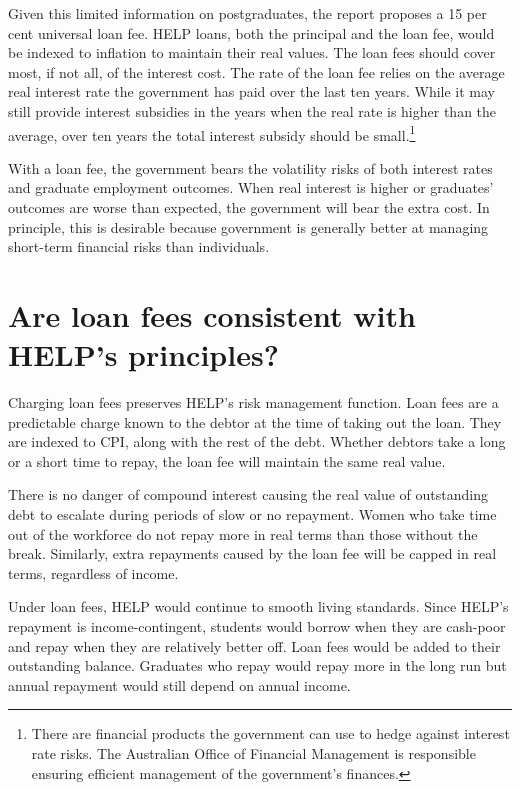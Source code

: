 \documentclass[embargoed]{grattan}
\begin{document}
Given this limited information on postgraduates, the report proposes a 15 per cent universal loan fee. HELP loans, both the principal and the loan fee, would be indexed to inflation to maintain their real values. The loan fees should cover most, if not all, of the interest cost. The rate of the loan fee relies on the average real interest rate the government has paid over the last ten years. While it may still provide interest subsidies in the years when the real rate is higher than the average, over ten years the total interest subsidy should be small.\footnote{There are financial products the government can use to hedge against interest rate risks. The Australian Office of Financial Management is responsible ensuring efficient management of the government's finances.}

With a loan fee, the government bears the volatility risks of both interest rates and graduate employment outcomes. When real interest is higher or graduates' outcomes are worse than expected, the government will bear the extra cost. In principle, this is desirable because government is generally better at managing short-term financial risks than individuals.

\section{Are loan fees consistent with HELP's principles? }\label{are-loan-fees-consistent-with-helps-principles}

Charging loan fees preserves HELP's risk management function. Loan fees are a predictable charge known to the debtor at the time of taking out the loan. They are indexed to CPI, along with the rest of the debt. Whether debtors take a long or a short time to repay, the loan fee will maintain the same real value.

There is no danger of compound interest causing the real value of outstanding debt to escalate during periods of slow or no repayment. Women who take time out of the workforce do not repay more in real terms than those without the break. Similarly, extra repayments caused by the loan fee will be capped in real terms, regardless of income.

Under loan fees, HELP would continue to smooth living standards. Since HELP's repayment is income-contingent, students would borrow when they are cash-poor and repay when they are relatively better off. Loan fees would be added to their outstanding balance. Graduates who repay would repay more in the long run but annual repayment would still depend on annual income.
\end{document}
